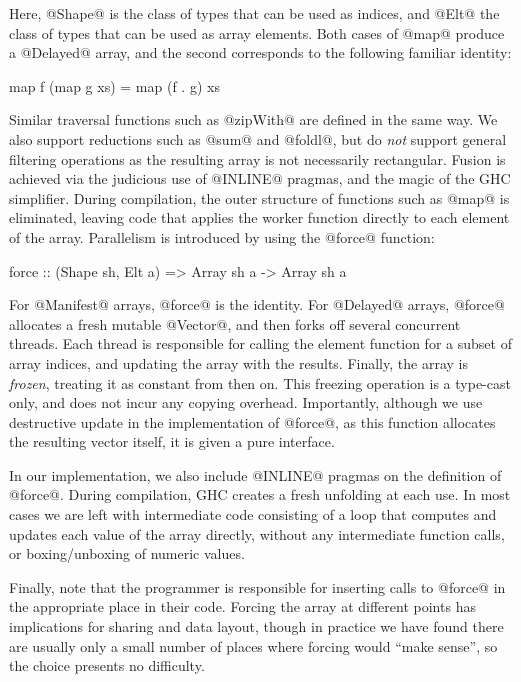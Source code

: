 Here, @Shape@ is the class of types that can be used as indices, and @Elt@ the class of types that can be used as array elements. Both cases of @map@ produce a @Delayed@ array, and the second corresponds to the following familiar identity:

\begin{code}
       map f (map g xs) = map (f . g) xs
\end{code}

Similar traversal functions such as @zipWith@ are defined in the same way. We also support reductions such as @sum@ and @foldl@, but do \emph{not} support general filtering operations as the resulting array is not necessarily rectangular. Fusion is achieved via the judicious use of @INLINE@ pragmas, and the magic of the GHC simplifier. During compilation, the outer structure of functions such as @map@ is eliminated, leaving code that applies the worker function directly to each element of the array. Parallelism is introduced by using the @force@ function:
\begin{code}
  force :: (Shape sh, Elt a) 
        => Array sh a -> Array sh a
\end{code}

For @Manifest@ arrays, @force@ is the identity. For @Delayed@ arrays, @force@ allocates a fresh mutable @Vector@, and then forks off several concurrent threads. Each thread is responsible for calling the element function for a subset of array indices, and updating the array with the results. Finally, the array is \emph{frozen}, treating it as constant from then on. This freezing operation is a type-cast only, and does not incur any copying overhead. Importantly, although we use destructive update in the implementation of @force@, as this function allocates the resulting vector itself, it is given a pure interface. 

In our implementation, we also include @INLINE@ pragmas on the definition of @force@. During compilation, GHC creates a fresh unfolding at each use. In most cases we are left with intermediate code consisting of a loop that computes and updates each value of the array directly, without any intermediate function calls, or boxing/unboxing of numeric values.

Finally, note that the programmer is responsible for inserting calls to @force@ in the appropriate place in their code. Forcing the array at different points has implications for sharing and data layout, though in practice we have found there are usually only a small number of places where forcing would ``make sense'', so the choice presents no difficulty. 


